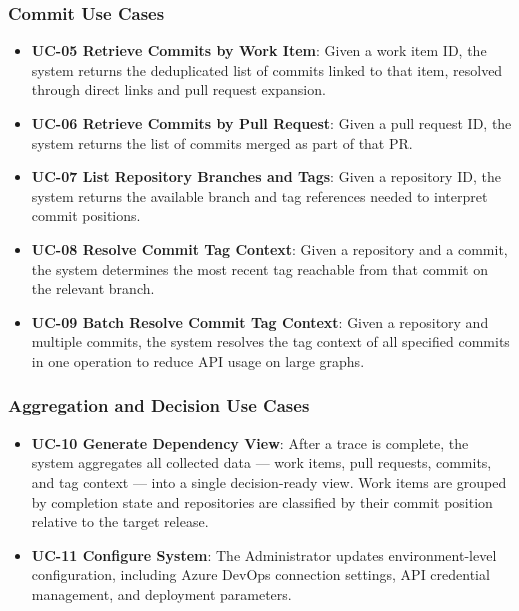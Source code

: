 \subsubsection{Commit Use Cases}

\begin{itemize}
  \item \textbf{UC-05  Retrieve Commits by Work Item}: Given a work item ID, the system returns the deduplicated list of commits linked to that item, resolved through direct links and pull request expansion.

  \item \textbf{UC-06  Retrieve Commits by Pull Request}: Given a pull request ID, the system returns the list of commits merged as part of that PR.

  \item \textbf{UC-07  List Repository Branches and Tags}: Given a repository ID, the system returns the available branch and tag references needed to interpret commit positions.

  \item \textbf{UC-08  Resolve Commit Tag Context}: Given a repository and a commit, the system determines the most recent tag reachable from that commit on the relevant branch.

  \item \textbf{UC-09  Batch Resolve Commit Tag Context}: Given a repository and multiple commits, the system resolves the tag context of all specified commits in one operation to reduce API usage on large graphs.
\end{itemize}

\subsubsection{Aggregation and Decision Use Cases}

\begin{itemize}
  \item \textbf{UC-10  Generate Dependency View}: After a trace is complete, the system aggregates all collected data — work items, pull requests, commits, and tag context — into a single decision-ready view. Work items are grouped by completion state and repositories are classified by their commit position relative to the target release.

  \item \textbf{UC-11  Configure System}: The Administrator updates environment-level configuration, including Azure DevOps connection settings, API credential management, and deployment parameters.
\end{itemize}

